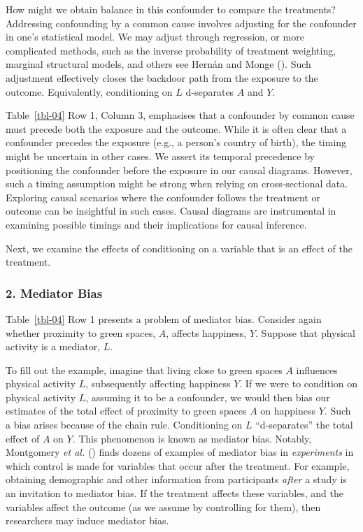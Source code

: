 \documentclass[
  singlecolumn]{article}
\begin{document}
How might we obtain balance in this confounder to compare the
treatments? Addressing confounding by a common cause involves adjusting
for the confounder in one's statistical model. We may adjust through
regression, or more complicated methods, such as the inverse probability
of treatment weighting, marginal structural models, and others see
Hernán and Monge (). Such adjustment
effectively closes the backdoor path from the exposure to the outcome.
Equivalently, conditioning on \(L\) d-separates \(A\) and \(Y\).

Table~\ref{tbl-04} Row 1, Column 3, emphasises that a confounder by
common cause must precede both the exposure and the outcome. While it is
often clear that a confounder precedes the exposure (e.g., a person's
country of birth), the timing might be uncertain in other cases. We
assert its temporal precedence by positioning the confounder before the
exposure in our causal diagrams. However, such a timing assumption might
be strong when relying on cross-sectional data. Exploring causal
scenarios where the confounder follows the treatment or outcome can be
insightful in such cases. Causal diagrams are instrumental in examining
possible timings and their implications for causal inference.

Next, we examine the effects of conditioning on a variable that is an
effect of the treatment.

\subsubsection{2. Mediator Bias}\label{mediator-bias}

Table~\ref{tbl-04} Row 1 presents a problem of mediator bias. Consider
again whether proximity to green spaces, \(A\), affects happiness,
\(Y\). Suppose that physical activity is a mediator, \(L\).

To fill out the example, imagine that living close to green spaces \(A\)
influences physical activity \(L\), subsequently affecting happiness
\(Y\). If we were to condition on physical activity \(L\), assuming it
to be a confounder, we would then bias our estimates of the total effect
of proximity to green spaces \(A\) on happiness \(Y\). Such a bias
arises because of the chain rule. Conditioning on \(L\) ``d-separates''
the total effect of \(A\) on \(Y\). This phenomenon is known as mediator
bias. Notably, Montgomery \emph{et al.}
() finds dozens of examples of
mediator bias in \emph{experiments} in which control is made for
variables that occur after the treatment. For example, obtaining
demographic and other information from participants \emph{after} a study
is an invitation to mediator bias. If the treatment affects these
variables, and the variables affect the outcome (as we assume by
controlling for them), then researchers may induce mediator bias.
\end{document}
